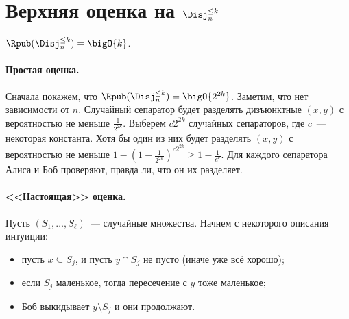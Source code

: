 \section{Верхняя оценка на \texorpdfstring{$\Disj^{\le k}_n$}{Disj(n, <=k)}}

\begin{theorem}
    $\Rpub(\Disj^{\le k}_n) = \bigO{k}$.
\end{theorem}

\paragraph{Простая оценка.}
Сначала покажем, что $\Rpub(\Disj^{\le k}_n) = \bigO{2^{2k}}$. Заметим, что нет зависимости от
$n$. Случайный сепаратор будет разделять дизъюнктные $(x, y)$ с вероятностью не меньше
$\frac{1}{2^{2k}}$. Выберем $c2^{2k}$ случайных сепараторов, где $c$~--- некоторая константа. Хотя бы
один из них будет разделять $(x, y)$ с вероятностью не меньше $1 - (1 - \frac{1}{2^{2k}})^{c 2^{2k}} \ge
1 - \frac{1}{e^c}$. Для каждого сепаратора Алиса и Боб проверяют, правда ли, что он их разделяет.

\paragraph{<<Настоящая>> оценка.} Пусть $(S_1, \dots, S_{\ell})$~--- случайные множества. Начнем с
некоторого описания интуиции:
\begin{itemize}
    \item пусть $x \subseteq S_j$, и пусть $y \cap S_j$ не пусто (иначе уже всё хорошо);
    \item если $S_j$ маленькое, тогда пересечение с $y$ тоже маленькое;
    \item Боб выкидывает $y \setminus S_j$ и они продолжают.
\end{itemize}

